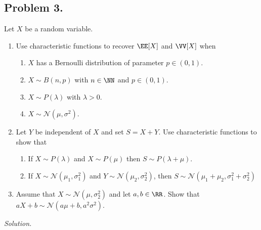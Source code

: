 \subsection*{Problem 3.} Let $X$ be a random variable. 
\begin{enumerate}
    \item  Use characteristic functions to recover $\EE[X]$ and $\VV[X]$ when
    \begin{enumerate}
        \item $X$ has a Bernoulli distribution of parameter $p\in(0, 1)$.
        \item $X \sim B(n, p)$ with $n\in\NN$ and $p\in(0, 1)$.
        \item $X \sim P(\lambda)$ with $\lambda > 0$.
        \item $X \sim\mathcal{N}(\mu, \sigma^2)$.
    \end{enumerate}
    \item Let $Y$ be independent of $X$ and set $S = X + Y$. Use characteristic functions to show that
    \begin{enumerate}
        \item If $X \sim P(\lambda)$ and $X \sim P(\mu)$ then $S \sim P(\lambda+\mu)$.
        \item If $X\sim\mathcal{N}(\mu_1, \sigma_1^2)$ and $Y\sim\mathcal{N}(\mu_2, \sigma_2^2)$, then $S\sim\mathcal{N}(\mu_1+\mu_2, \sigma_1^2+\sigma_2^2)$
    \end{enumerate}
    \item Assume that $X\sim\mathcal{N}(\mu,\sigma_2^2)$ and let $a,b\in\RR$. Show that $aX + b\sim\mathcal{N}(a\mu + b, a^2\sigma^2)$.
\end{enumerate}

\textit{Solution.}
